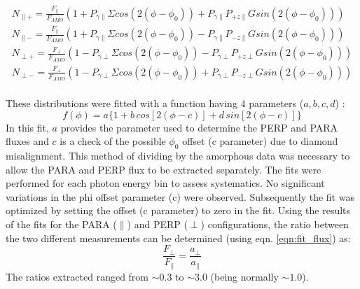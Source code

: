 \begin{eqnarray}
N_{\parallel +} = \frac{F_{\parallel}}{F_{AMO}} \left( 1 + P_{\gamma \parallel}\Sigma cos(2(\phi-\phi_0)) + P_{\gamma \parallel} P_{+z\parallel} G sin(2(\phi-\phi_0)) \right) \label{eq:N1}\\
N_{\parallel -} = \frac{F_{\parallel}}{F_{AMO}} \left( 1 + P_{\gamma \parallel}\Sigma cos(2(\phi-\phi_0)) - P_{\gamma \parallel} P_{-z\parallel} G sin(2(\phi-\phi_0)) \right) \label{eq:N2}\\
N_{\perp +} = \frac{F_{\perp}}{F_{AMO}} \left( 1 - P_{\gamma \perp}\Sigma cos(2(\phi-\phi_0)) - P_{\gamma \perp} P_{+z\perp} G sin(2(\phi-\phi_0)) \right) \label{eq:N3}\\
N_{\perp -} = \frac{F_{\perp}}{F_{AMO}} \left( 1 - P_{\gamma \perp}\Sigma cos(2(\phi-\phi_0)) + P_{\gamma \perp} P_{-z\perp} G sin(2(\phi-\phi_0)) \right) \label{eq:N4}\\
\end{eqnarray}


These distributions were fitted with a function having 4 parameters ($ a,b,c,d $) :
\begin{equation} \label{eqn:fit_flux}
f(\phi) = a \{ 1 + b\, cos[2 (\phi - c) ]  + d\, sin[2(\phi - c)] \} 
\end{equation}
In this fit, $a$ provides the parameter used to determine the PERP and PARA fluxes and $c$ is a check of the possible $\phi_0$ offset (c parameter) due to diamond misalignment.
This method of dividing by the amorphous data was necessary to allow the PARA and PERP flux to be extracted separately. The fits were performed for each photon energy bin to assess systematics. No significant variations in the phi offset parameter (c) were observed. Subsequently the fit was optimized by setting the offset (c parameter) to zero in the fit. 
Using the results of the fits for the PARA ($\parallel$) and PERP ($\perp$) configurations, the ratio between the two different measurements can be determined (using eqn. \ref{eqn:fit_flux}) as:
\begin{equation}
\frac{F_{\perp}}{F_{\parallel}} = \frac{a_{\perp}}{a_{\parallel}}
\end{equation}
The ratios extracted ranged from $\sim 0.3$ to $\sim 3.0$ (being normally $\sim 1.0$).


